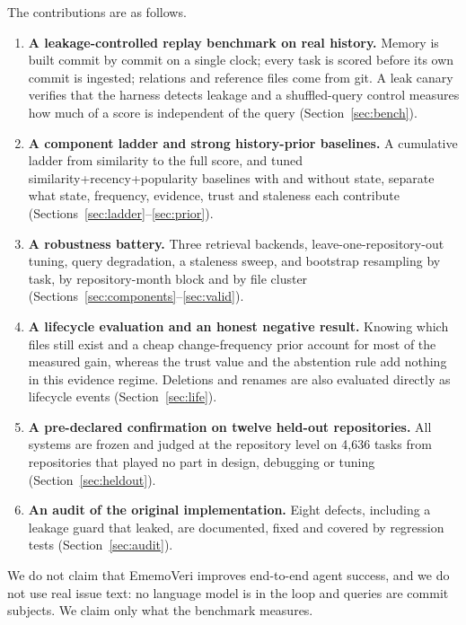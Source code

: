 \documentclass[runningheads]{llncs}
\newcommand{\sys}{EmemoVeri}
\begin{document}
\noindent The contributions are as follows.
\begin{enumerate}
\item \textbf{A leakage-controlled replay benchmark on real history.} Memory is built commit by commit on a single clock; every task is scored before its own commit is ingested; relations and reference files come from git. A leak canary verifies that the harness detects leakage and a shuffled-query control measures how much of a score is independent of the query (Section~\ref{sec:bench}).
\item \textbf{A component ladder and strong history-prior baselines.} A cumulative ladder from similarity to the full score, and tuned similarity+recency+popularity baselines with and without state, separate what state, frequency, evidence, trust and staleness each contribute (Sections~\ref{sec:ladder}--\ref{sec:prior}).
\item \textbf{A robustness battery.} Three retrieval backends, leave-one-repository-out tuning, query degradation, a staleness sweep, and bootstrap resampling by task, by repository-month block and by file cluster (Sections~\ref{sec:components}--\ref{sec:valid}).
\item \textbf{A lifecycle evaluation and an honest negative result.} Knowing which files still exist and a cheap change-frequency prior account for most of the measured gain, whereas the trust value and the abstention rule add nothing in this evidence regime. Deletions and renames are also evaluated directly as lifecycle events (Section~\ref{sec:life}).
\item \textbf{A pre-declared confirmation on twelve held-out repositories.} All systems are frozen and judged at the repository level on 4{,}636 tasks from repositories that played no part in design, debugging or tuning (Section~\ref{sec:heldout}).
\item \textbf{An audit of the original implementation.} Eight defects, including a leakage guard that leaked, are documented, fixed and covered by regression tests (Section~\ref{sec:audit}).
\end{enumerate}
We do not claim that \sys{} improves end-to-end agent success, and we do not use real issue text: no language model is in the loop and queries are commit subjects. We claim only what the benchmark measures.
\end{document}
